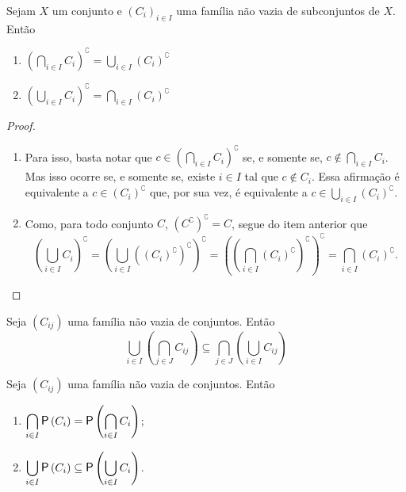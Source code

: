 \begin{proposition}
Sejam $X$ um conjunto e $(C_i)_{i \in I}$ uma família não vazia de subconjuntos de $X$. Então
	\begin{enumerate}
	\item $\displaystyle \left( \bigcap_{i \in I} C_i \right)^\complement = \bigcup_{i \in I} (C_i)^\complement$
	
	\item $\displaystyle \left( \bigcup_{i \in I} C_i \right)^\complement = \bigcap_{i \in I} (C_i)^\complement$
	\end{enumerate}
\end{proposition}
\begin{proof}
	\begin{enumerate}
	\item Para isso, basta notar que $c \in \left( \bigcap_{i \in I} C_i \right)^\complement$ se, e somente se, $c \notin \bigcap_{i \in I} C_i$. Mas isso ocorre se, e somente se, existe $i \in I$ tal que $c \notin C_i$. Essa afirmação é equivalente a $c \in (C_i)^\complement$ que, por sua vez, é equivalente a $ c \in \bigcup_{i \in I} (C_i)^\complement$.
	
		\item Como, para todo conjunto $C$, $(C^\complement)^\complement = C$, segue do item anterior que
		\begin{equation*}
		\displaystyle \left( \bigcup_{i \in I} C_i \right)^\complement = \left( \bigcup_{i \in I} ((C_i)^\complement)^\complement \right)^\complement = \left( \left( \bigcap_{i \in I} (C_i)^\complement \right)^\complement \right)^\complement = \bigcap_{i \in I} (C_i)^\complement.
		\end{equation*}
	\end{enumerate}
\end{proof}

\begin{proposition}
Seja $(C_{ij})$ uma família não vazia de conjuntos. Então
	\begin{equation*}
	\bigcup_{i \in I} \left( \bigcap_{j \in J} C_{ij} \right) \subseteq \bigcap_{j \in J} \left( \bigcup_{i \in I} C_{ij} \right)
	\end{equation*}
\end{proposition}

\begin{proposition}
Seja $(C_{ij})$ uma família não vazia de conjuntos. Então
	\begin{enumerate}
	\item $\displaystyle\bigcap_{i \in I} \p\left(C_i \right) = \p\left(\displaystyle\bigcap_{i \in I} C_i \right)$;
	\item $\displaystyle\bigcup_{i \in I} \p\left(C_i \right) \subseteq \p\left(\displaystyle\bigcup_{i \in I} C_i \right)$.
	\end{enumerate}
\end{proposition}

